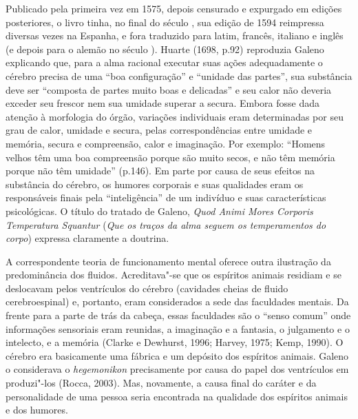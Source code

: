 Publicado pela primeira vez em 1575, depois censurado e expurgado em
edições posteriores, o livro tinha, no final do século , sua edição
de 1594 reimpressa diversas vezes na Espanha, e fora traduzido para
latim, francês, italiano e inglês (e depois para o alemão no século
). Huarte (1698, p.92) reproduzia Galeno explicando que, para a
alma racional executar suas ações adequadamente o cérebro precisa de uma
``boa configuração'' e ``unidade das partes'', sua substância deve ser
``composta de partes muito boas e delicadas'' e seu calor não deveria
exceder seu frescor nem sua umidade superar a secura. Embora fosse dada
atenção à morfologia do órgão, variações individuais eram determinadas
por seu grau de calor, umidade e secura, pelas correspondências entre
umidade e memória, secura e compreensão, calor e imaginação. Por
exemplo: ``Homens velhos têm uma boa compreensão porque são muito secos,
e não têm memória porque não têm umidade'' (p.146). Em parte por causa
de seus efeitos na substância do cérebro, os humores corporais e suas
qualidades eram os responsáveis finais pela ``inteligência'' de um
indivíduo e suas características psicológicas. O título do tratado de
Galeno, \emph{Quod Animi Mores Corporis Temperatura Squantur} (\emph{Que
os traços da alma seguem os temperamentos do corpo}) expressa claramente
a doutrina.

A correspondente teoria de funcionamento mental oferece outra ilustração
da predominância dos fluidos. Acreditava"-se que os espíritos animais
residiam e se deslocavam pelos ventrículos do cérebro (cavidades cheias
de fluido cerebroespinal) e, portanto, eram considerados a sede das
faculdades mentais. Da frente para a parte de trás da cabeça, essas
faculdades são o ``senso comum'' onde informações sensoriais eram
reunidas, a imaginação e a fantasia, o julgamento e o intelecto, e a
memória (Clarke e Dewhurst, 1996; Harvey, 1975; Kemp, 1990). O cérebro
era basicamente uma fábrica e um depósito dos espíritos animais. Galeno
o considerava o \emph{hegemonikon} precisamente por causa do papel dos
ventrículos em produzi"-los (Rocca, 2003). Mas, novamente, a causa final
do caráter e da personalidade de uma pessoa seria encontrada na
qualidade dos espíritos animais e dos humores.

